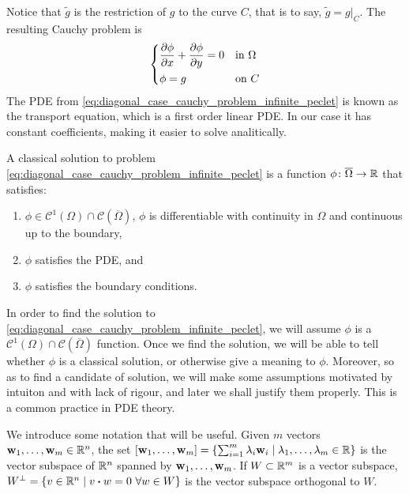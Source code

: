 Notice that $\tilde{g}$ is the restriction of $g$ to the curve $C$, that is to
say, $\tilde{g} = g \rvert_C$. The resulting Cauchy problem is
\begin{equation} \label{eq:diagonal_case_cauchy_problem_infinite_peclet}
	\left\{
	\begin{aligned}
		&\pdv{\phi}{x} + \pdv{\phi}{y} = 0 &
		&\text{in } \Omega \\
		&\phi = g &
		&\text{on } C
	\end{aligned}
	\right.
\end{equation}
The PDE from \eqref{eq:diagonal_case_cauchy_problem_infinite_peclet} is known as the
transport equation, which is a first order linear PDE. In our case it has
constant coefficients, making it easier to solve analitically.

\begin{definition}
	A classical solution to problem
	\eqref{eq:diagonal_case_cauchy_problem_infinite_peclet} is a function $\phi
	\colon \overline{\Omega} \rightarrow \mathbb{R}$ that satisfies:
	\begin{enumerate}[label={(\roman*)}, topsep=0pt]
		\item $\phi \in \mathcal{C}^1(\Omega) \cap
		\mathcal{C}(\overline{\Omega})$, \ie $\phi$ is differentiable with
		continuity in $\Omega$ and continuous up to the boundary,
		\item $\phi$ satisfies the PDE, and
		\item $\phi$ satisfies the boundary conditions.
	\end{enumerate}
\end{definition}
In order to find the solution to
\eqref{eq:diagonal_case_cauchy_problem_infinite_peclet}, we will assume $\phi$
is a $\mathcal{C}^1(\Omega) \cap \mathcal{C}(\overline{\Omega})$ function. Once
we find the solution, we will be able to tell whether $\phi$ is a classical
solution, or otherwise give a meaning to $\phi$. Moreover, so as to find a
candidate of solution, we will make some assumptions motivated by intuiton and
with lack of rigour, and later we shall justify them properly. This is a common
practice in PDE theory.

We introduce some notation that will be useful. Given $m$ vectors $\vb{w}_1,
\ldots, \vb{w}_m \in \mathbb{R}^n$, the set $[\vb{w}_1, \ldots, \vb{w}_m] = \{
\sum_{i=1}^m \lambda_i \vb{w}_i \mid \lambda_1, \ldots, \lambda_m \in \mathbb{R} \}$
is the vector subspace of $\mathbb{R}^n$ spanned by $\vb{w}_1, \ldots, \vb{w}_m$. If
$W \subset \mathbb{R}^m$ is a vector subspace, $W^\perp = \{ v \in \real^n \mid v
\vdot w = 0 \ \forall w \in W \}$ is the vector subspace orthogonal to $W$.

